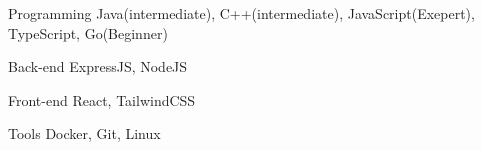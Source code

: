 

\begin{cvskills}

  \cvskill
    {Programming} %
    {Java(intermediate), C++(intermediate), JavaScript(Exepert), TypeScript, Go(Beginner)} %

  \cvskill
    {Back-end} %
    {ExpressJS, NodeJS} %

  \cvskill
    {Front-end} %
    {React, TailwindCSS} %


  \cvskill
    {Tools} %
    {Docker, Git, Linux} %

\end{cvskills}
